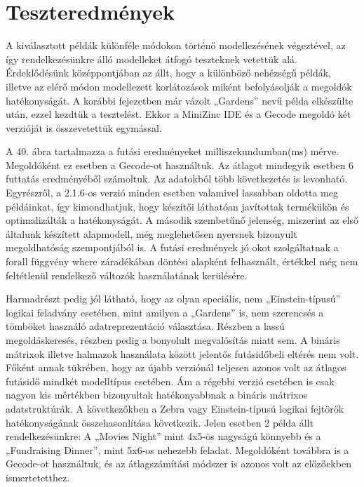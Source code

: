 \documentclass[12pt,a4paper,twoside, openright]{report}
\begin{document}

\section{Teszteredmények}

    A kiválasztott példák különféle módokon történő modellezésének végeztével, az így rendelkezésünkre álló modelleket átfogó teszteknek vetettük alá.
    Érdeklődésünk középpontjában az állt, hogy a különböző nehézségű példák, illetve az elérő módon modellezett korlátozások miként befolyásolják a megoldók hatékonyságát.
    A korábbi fejezetben már vázolt „Gardens” nevű példa elkészülte után, ezzel kezdtük a tesztelést.
    Ekkor a MiniZinc IDE és a Gecode megoldó két verzióját is összevetettük egymással.


    A 40. ábra tartalmazza a futási eredményeket milliszekundumban(ms) mérve.
    Megoldóként ez esetben a Gecode-ot használtuk.
    Az átlagot mindegyik esetben 6 futtatás eredményéből számoltuk.
    Az adatokból több következetés is levonható.
    Egyrészről, a 2.1.6-os verzió minden esetben valamivel lassabban oldotta meg példáinkat, így kimondhatjuk, hogy készítői láthatóan javítottak termékükön és optimalizálták a hatékonyságát.
    A második szembetűnő jelenség, miszerint az első általunk készített alapmodell, még meglehetősen nyersnek bizonyult megoldhatóság szempontjából is.
    A futási eredmények jó okot szolgáltatnak a forall függvény where záradékában döntési alapként felhasznált, értékkel még nem feltétlenül rendelkező változók használatának kerülésére.

    Harmadrészt pedig jól látható, hogy az olyan speciális, nem „Einstein-típusú” logikai feladvány esetében, mint amilyen a „Gardens” is, nem szerencsés a tömböket használó adatreprezentáció választása.
    Részben a lassú megoldáskeresés, részben pedig a bonyolult megvalósítás miatt sem.
    A bináris mátrixok illetve halmazok használata között jelentős futásidőbeli eltérés nem volt.
    Főként annak tükrében, hogy az újabb verziónál teljesen azonos volt az átlagos futásidő mindkét modelltípus esetében.
    Ám a régebbi verzió esetében is csak nagyon kis mértékben bizonyultak hatékonyabbnak a bináris mátrixos adatstruktúrák.
    A következőkben a Zebra vagy Einstein-típusú logikai fejtörők hatékonyságának 
    összehasonlítása következik.
    Jelen esetben 2 példa állt rendelkezésünkre: A „Movies 
    Night” mint 4x5-ös nagyságú könnyebb és a „Fundraising Dinner”, mint 5x6-os nehezebb 
    feladat.
    Megoldóként továbbra is a Gecode-ot használtuk, és az átlagszámítási módszer 
    is azonos volt az előzőekben ismertetetthez.
\end{document}
